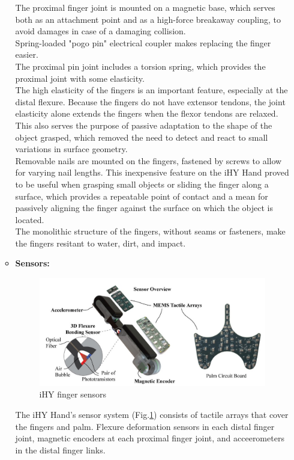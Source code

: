 \documentclass[a4paper, 10pt, conference]{ieeeconf}      %
\begin{document}
\begin{itemize}
\begin{itemize}
The proximal finger joint is mounted on a magnetic base, which serves both as an attachment point and as a high-force breakaway coupling, to avoid damages in case of a damaging collision.\\
Spring-loaded "pogo pin" electrical coupler makes replacing the finger easier.\\
The proximal pin joint includes a torsion spring, which provides the proximal joint with some elasticity.\\
The high elasticity of the fingers is an important feature, especially at the distal flexure. Because the fingers do not have extensor tendons, the joint elasticity alone extends the fingers when the flexor tendons are relaxed. This also serves the purpose of passive adaptation to the shape of the object grasped, which removed the need to detect and react to small variations in surface geometry.\\
Removable nails are mounted on the fingers, fastened by screws to allow for varying nail lengths. This inexpensive feature on the iHY Hand proved to be useful when grasping small objects or sliding the finger along a surface, which provides a repeatable point of contact and a mean for passively aligning the finger against the surface on which the object is located.\\
The monolithic structure of the fingers, without seams or fasteners, make the fingers resitant to water, dirt, and impact.\\
		\item \textbf{Sensors:}\\
	\begin{figure}[h!]
\centering
  \includegraphics[width=1.0\linewidth]{./images/ihySensors}
  \caption{iHY finger sensors}
  \label{fig:ihySensors}
	\end{figure}
The iHY Hand's sensor system (Fig.\ref{fig:ihySensors}) consists of tactile arrays that cover the fingers and palm. Flexure deformation sensors in each distal finger joint, magnetic encoders at each proximal finger joint, and acceerometers in the distal finger links.\\

\end{itemize}
\end{itemize}
\end{document}
